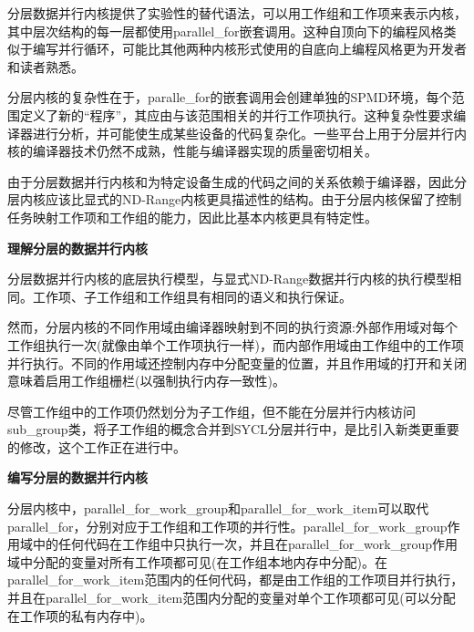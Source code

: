 分层数据并行内核提供了实验性的替代语法，可以用工作组和工作项来表示内核，其中层次结构的每一层都使用parallel\_for嵌套调用。这种自顶向下的编程风格类似于编写并行循环，可能比其他两种内核形式使用的自底向上编程风格更为开发者和读者熟悉。\par

分层内核的复杂性在于，paralle\_for的嵌套调用会创建单独的SPMD环境，每个范围定义了新的“程序”，其应由与该范围相关的并行工作项执行。这种复杂性要求编译器进行分析，并可能使生成某些设备的代码复杂化。一些平台上用于分层并行内核的编译器技术仍然不成熟，性能与编译器实现的质量密切相关。\par

由于分层数据并行内核和为特定设备生成的代码之间的关系依赖于编译器，因此分层内核应该比显式的ND-Range内核更具描述性的结构。由于分层内核保留了控制任务映射工作项和工作组的能力，因此比基本内核更具有特定性。\par

\hspace*{\fill} \par %
\textbf{理解分层的数据并行内核}

分层数据并行内核的底层执行模型，与显式ND-Range数据并行内核的执行模型相同。工作项、子工作组和工作组具有相同的语义和执行保证。\par

然而，分层内核的不同作用域由编译器映射到不同的执行资源:外部作用域对每个工作组执行一次(就像由单个工作项执行一样)，而内部作用域由工作组中的工作项并行执行。不同的作用域还控制内存中分配变量的位置，并且作用域的打开和关闭意味着启用工作组栅栏(以强制执行内存一致性)。\par

尽管工作组中的工作项仍然划分为子工作组，但不能在分层并行内核访问sub\_group类，将子工作组的概念合并到SYCL分层并行中，是比引入新类更重要的修改，这个工作正在进行中。\par

\hspace*{\fill} \par %
\textbf{编写分层的数据并行内核}

分层内核中，parallel\_for\_work\_group和parallel\_for\_work\_item可以取代parallel\_for，分别对应于工作组和工作项的并行性。parallel\_for\_work\_group作用域中的任何代码在工作组中只执行一次，并且在parallel\_for\_work\_group作用域中分配的变量对所有工作项都可见(在工作组本地内存中分配)。在parallel\_for\_work\_item范围内的任何代码，都是由工作组的工作项目并行执行，并且在parallel\_for\_work\_item范围内分配的变量对单个工作项都可见(可以分配在工作项的私有内存中)。\par

